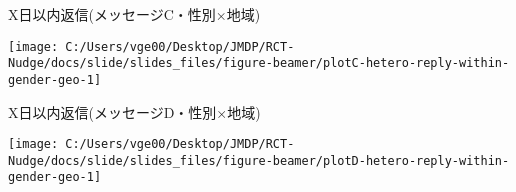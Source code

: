 \documentclass[
      aspectratio=169,
        12pt,
    ]{beamer}
\begin{document}
\begin{frame}{X日以内返信(メッセージC・性別×地域)}
\protect\hypertarget{xux65e5ux4ee5ux5185ux8fd4ux4fe1ux30e1ux30c3ux30bbux30fcux30b8cux6027ux5225ux5730ux57df}{}
\begin{center}\texttt{[image: C:/Users/vge00/Desktop/JMDP/RCT-Nudge/docs/slide/slides\_files/figure-beamer/plotC-hetero-reply-within-gender-geo-1]} \end{center}
\end{frame}

\begin{frame}{X日以内返信(メッセージD・性別×地域)}
\protect\hypertarget{xux65e5ux4ee5ux5185ux8fd4ux4fe1ux30e1ux30c3ux30bbux30fcux30b8dux6027ux5225ux5730ux57df}{}
\begin{center}\texttt{[image: C:/Users/vge00/Desktop/JMDP/RCT-Nudge/docs/slide/slides\_files/figure-beamer/plotD-hetero-reply-within-gender-geo-1]} \end{center}
\end{frame}
\end{document}
